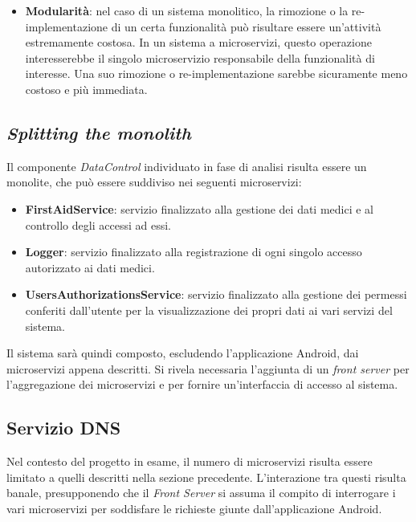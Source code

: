 \documentclass[a4paper,12pt]{report}
\begin{document}
\begin{itemize}
	\item \textbf{Modularità}: nel caso di un sistema monolitico, la rimozione o la re-implementazione di un certa funzionalità può risultare essere un'attività estremamente costosa. In un sistema a microservizi, questo operazione interesserebbe il singolo microservizio responsabile della funzionalità di interesse. Una suo rimozione o re-implementazione sarebbe sicuramente meno costoso e più immediata.
\end{itemize}


\subsection{\emph{Splitting the monolith}}

Il componente \emph{DataControl} individuato in fase di analisi risulta essere un monolite, che può essere suddiviso nei seguenti microservizi:

\begin{itemize}
	\item \textbf{FirstAidService}: servizio finalizzato alla gestione dei dati medici e al controllo degli accessi ad essi. 
	\item \textbf{Logger}: servizio finalizzato alla registrazione di ogni singolo accesso autorizzato ai dati medici.
	\item \textbf{UsersAuthorizationsService}: servizio finalizzato alla gestione dei permessi conferiti dall'utente per la visualizzazione dei propri dati ai vari servizi del sistema. 
\end{itemize}

Il sistema sarà quindi composto, escludendo l'applicazione Android, dai microservizi appena descritti. Si rivela necessaria l'aggiunta di un \emph{front server} per l'aggregazione dei microservizi e per fornire un'interfaccia di accesso al sistema.

\subsection{Servizio DNS}

Nel contesto del progetto in esame, il numero di microservizi risulta essere limitato a quelli descritti nella sezione precedente. L'interazione tra questi risulta banale, presupponendo che il \emph{Front Server} si assuma il compito di interrogare i vari microservizi per soddisfare le richieste giunte dall'applicazione Android.
\end{document}
